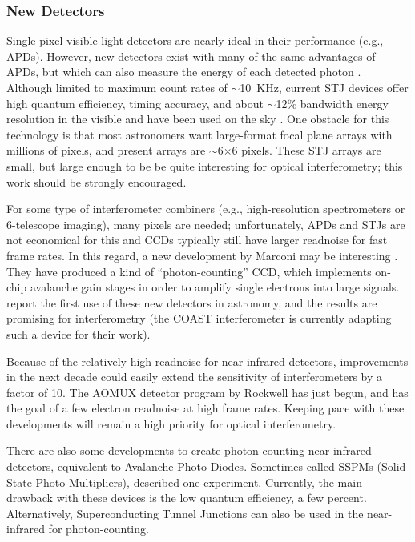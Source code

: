 \documentclass[12pt]{iopart}
\begin{document}
\subsubsection{New Detectors}
Single-pixel visible light detectors are nearly ideal in their performance
(e.g., APDs).
However, new detectors exist with many of the same
advantages of APDs, but which can also measure the energy of each
detected photon \citep[Superconducting Tunnel Junction
detectors,][]{peacock1997}.  Although limited to maximum count rates
of $\sim$10~KHz, current STJ devices offer high quantum
efficiency, timing accuracy, and about $\sim$12\% bandwidth energy
resolution in the visible and have been used on the sky
\citep{perryman2001}.  One obstacle for this technology is that most
astronomers want large-format focal plane arrays with millions of
pixels, and present arrays are $\sim$6$\times$6 pixels.  These STJ
arrays are small, but large enough to be be quite interesting for
optical interferometry; this work should be strongly encouraged.

For some type of interferometer combiners (e.g., high-resolution
spectrometers or 6-telescope imaging), many pixels are needed;
unfortunately, APDs and STJs are not economical for this and CCDs
typically still have larger readnoise for fast frame rates.  In this
regard, a new development by Marconi may be interesting
\citep{mackay2001}. They have produced a kind of ``photon-counting''
CCD, which implements on-chip avalanche gain stages in order to
amplify single electrons into large signals.  \citet{tubbs2002} report
the first use of these new detectors in astronomy, and the results are
promising for interferometry (the COAST interferometer is currently
adapting such a device for their work).

Because of the relatively high readnoise for near-infrared detectors,
improvements in the next decade could easily extend the sensitivity of
interferometers by a factor of 10. The AOMUX detector program by
Rockwell has just begun, and has the goal of a few electron readnoise
at high frame rates.  Keeping pace with these developments will remain
a high priority for optical interferometry.

There are also some developments to create photon-counting
near-infrared detectors, equivalent to Avalanche Photo-Diodes.
Sometimes called SSPMs (Solid State Photo-Multipliers),
\citet{eikenberry1996} described one experiment. Currently, the main
drawback with these devices is the low quantum efficiency, a few
percent.  Alternatively, Superconducting Tunnel Junctions can also be
used in the near-infrared for photon-counting.
\end{document}
